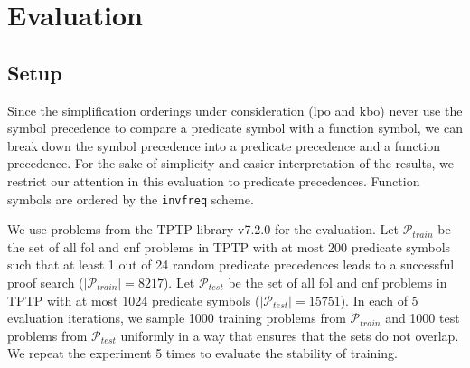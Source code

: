 \section{Evaluation}
\label{sec:evaluation}

\subsection{Setup}

Since the simplification orderings under consideration (\acrshort*{lpo} and \acrshort*{kbo})
never use the symbol precedence to compare a predicate symbol with a function symbol,
we can break down the symbol precedence  into a predicate precedence and a function precedence.
For the sake of simplicity and easier interpretation of the results,
we restrict our attention in this evaluation to predicate precedences.
Function symbols are ordered by the \texttt{invfreq} scheme.

%	
%	
%	
%	

\newcommand{\ProblemsTrain}{\mathcal{P}_{\mathit{train}}}
\newcommand{\ProblemsTest}{\mathcal{P}_{\mathit{test}}}

We use problems from the TPTP library v7.2.0 \cite{Sut17} for the evaluation.
Let \(\ProblemsTrain\) be the set of all \acrshort*{fol} and \acrshort*{cnf} problems in TPTP
with at most 200 predicate symbols such that at least 1 out of 24 random predicate precedences
leads to a successful proof search (\(|\ProblemsTrain| = 8217\)).
Let \(\ProblemsTest\) be the set of all \acrshort*{fol} and \acrshort*{cnf} problems in TPTP
with at most 1024 predicate symbols (\(|\ProblemsTest| = 15751\)).
In each of 5 evaluation iterations,
we sample 1000 training problems from \(\ProblemsTrain\)
and 1000 test problems from \(\ProblemsTest\)
uniformly in a way that ensures that the sets do not overlap.
We repeat the experiment 5 times to evaluate the stability of training.

